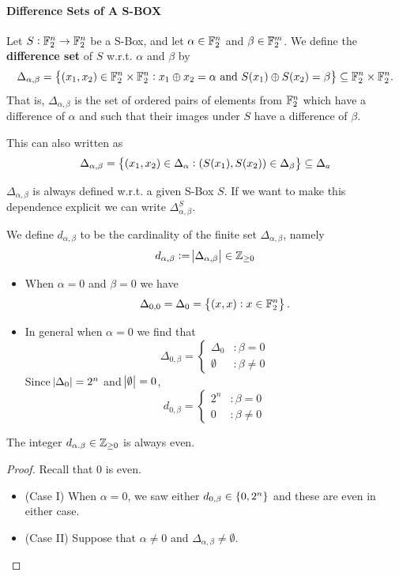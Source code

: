 \documentclass[11pt,openany]{article}
\begin{document}
\paragraph{Difference Sets of A S-BOX}

\begin{definition}
	Let $S:\mathbb{F}_2^n\to\mathbb{F}_2^n$ be a S-Box, and let $\alpha\in\mathbb{F}_2^n$ and $\beta\in\mathbb{F}_2^m$. We define the \textbf{difference set} of $S$ w.r.t. $\alpha$ and $\beta$ by \[
	\Delta_{\alpha,\beta}=\set{(x_1,x_2)\in\mathbb{F}_2^n\times\mathbb{F}_2^n:x_1\oplus x_2=\alpha\ \text{and}\ S(x_1)\oplus S(x_2)=\beta}\subseteq\mathbb{F}_2^n\times\mathbb{F}_2^n.
	\] That is, $\Delta_{\alpha,\beta}$ is the set of ordered pairs of elements from $\mathbb{F}_2^n$ which have a difference of $\alpha$ and such that their images under $S$ have a difference of $\beta$.
\end{definition}
\begin{remark}
	This can also written as \[
	\Delta_{\alpha,\beta}=\set{(x_1,x_2)\in\Delta_\alpha:(S(x_1),S(x_2))\in\Delta_\beta}\subseteq\Delta_a
	\]
\end{remark}
\begin{note}
	$\Delta_{\alpha,\beta}$ is always defined w.r.t. a given S-Box $S$. If we want to make this dependence explicit we can write $\Delta_{\alpha,\beta}^S$.
\end{note}

\begin{note}
	We define $d_{\alpha,\beta}$ to be the cardinality of the finite set $\Delta_{\alpha,\beta}$, namely \[
	d_{\alpha,\beta}:=\abs{\Delta_{\alpha,\beta}}\in\mathbb{Z}_{\geq 0}
	\]
\end{note}
\begin{itemize}
	\item When $\alpha=0$ and $\beta=0$ we have \[
	\Delta_{0,0}=\Delta_0=\set{(x,x):x\in\mathbb{F}_2^n}.
	\]
	\item In general when $\alpha=0$ we find that \[
	\Delta_{0,\beta}=\begin{cases}
		\Delta_0 &:\beta=0\\
		\emptyset &:\beta\neq 0
	\end{cases}
	\] Since $\abs{\Delta_0}=2^n$ and $\abs{\emptyset}=0$, \[
	d_{0,\beta}=\begin{cases}
		2^n &:\beta=0 \\
		0 &:\beta\neq 0
	\end{cases}
	\]
\end{itemize}

\begin{proposition}
	The integer $d_{\alpha.\beta}\in\mathbb{Z}_{\geq 0}$ is always even.
\end{proposition}
\begin{proof}
	Recall that $0$ is even.
	\begin{itemize}
		\item[] (Case I) When $\alpha=0$, we saw either $d_{0,\beta}\in\set{0,2^n}$ and these are even in either case.
		\item[] (Case II) Suppose that $\alpha\neq 0$ and $\Delta_{\alpha,\beta}\neq\emptyset$.
	\end{itemize}
\end{proof}
\end{document}
